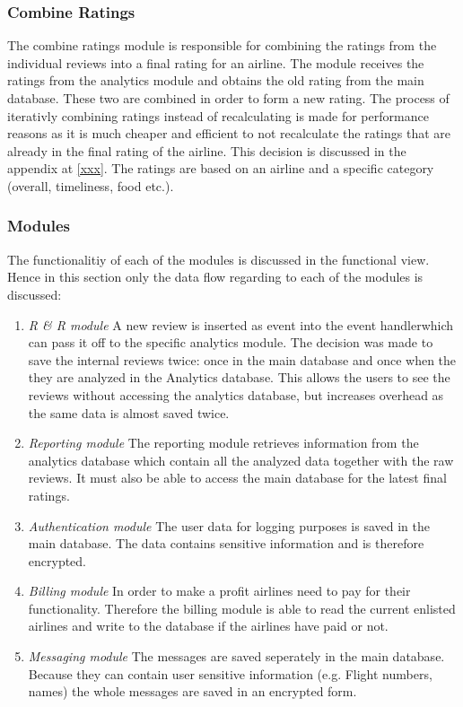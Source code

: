 \subsubsection{Combine Ratings}

The combine ratings module is responsible for combining the ratings from the individual reviews into a final rating for an airline. The module receives the ratings from the analytics module and obtains the old rating from the main database. These two are combined in order to form a new rating. The process of iterativly combining ratings instead of recalculating is made for performance reasons as it is much cheaper and efficient to not recalculate the ratings that are already in the final rating of the airline. This decision is discussed in the appendix at \ref{xxx}. The ratings are based on an airline and a specific category (overall, timeliness, food etc.).

\subsubsection{Modules}
The functionalitiy of each of the modules is discussed in the functional view. Hence in this section only the data flow regarding to each of the modules is discussed:

\begin{enumerate}
\item \emph{R \& R module} A new review is inserted as event into the event handlerwhich can pass it off to the specific analytics module. The decision was made to save the internal reviews twice: once in the main database and once when the they are analyzed in the Analytics database. This allows the users to see the reviews without accessing the analytics database, but increases overhead as the same data is almost saved twice.
\item \emph{Reporting module} The reporting module retrieves information from the analytics database which contain all the analyzed data together with the raw reviews. It must also be able to access the main database for the latest final ratings.
\item \emph{Authentication module} The user data for logging purposes is saved in the main database. The data contains sensitive information and is therefore encrypted.
\item \emph{Billing module} In order to make a profit airlines need to pay for their functionality. Therefore the billing module is able to read the current enlisted airlines and write to the database if the airlines have paid or not.
\item \emph{Messaging module} The messages are saved seperately in the main database. Because they can contain user sensitive information (e.g. Flight numbers, names) the whole messages are saved in an encrypted form. 
\end{enumerate}
